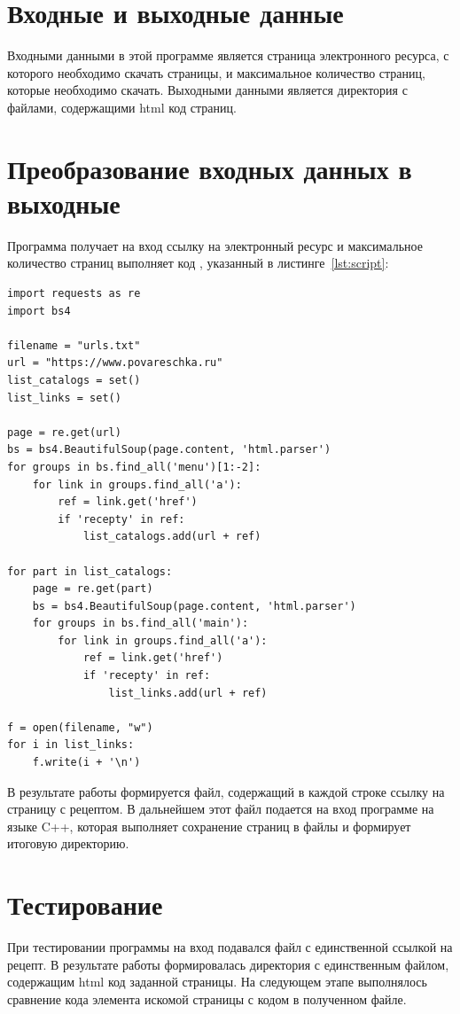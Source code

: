 \documentclass{article}
\begin{document}
\clearpage\section{Входные и выходные данные}
Входными данными в этой программе является страница электронного ресурса, с которого необходимо скачать страницы, и
максимальное количество страниц, которые необходимо скачать. Выходными данными является директория с файлами,
содержащими html код страниц.

\clearpage\section{Преобразование входных данных в выходные}
Программа получает на вход ссылку на электронный ресурс и максимальное количество страниц выполняет код , указанный в
листинге~\ref{lst:script}:
\begin{lstlisting}[style=python, label=lst:script,caption=Скрипт на языке Python$^{[3]}$ для получения файла ссылок ля дальнейшей обработки]
import requests as re
import bs4

filename = "urls.txt"
url = "https://www.povareschka.ru"
list_catalogs = set()
list_links = set()

page = re.get(url)
bs = bs4.BeautifulSoup(page.content, 'html.parser')
for groups in bs.find_all('menu')[1:-2]:
    for link in groups.find_all('a'):
        ref = link.get('href')
        if 'recepty' in ref:
            list_catalogs.add(url + ref)

for part in list_catalogs:
    page = re.get(part)
    bs = bs4.BeautifulSoup(page.content, 'html.parser')
    for groups in bs.find_all('main'):
        for link in groups.find_all('a'):
            ref = link.get('href')
            if 'recepty' in ref:
                list_links.add(url + ref)

f = open(filename, "w")
for i in list_links:
    f.write(i + '\n')
\end{lstlisting}

В результате работы формируется файл, содержащий в каждой строке ссылку на страницу с рецептом. В дальнейшем этот файл
подается на вход программе на языке C++, которая выполняет сохранение страниц в файлы и формирует итоговую директорию.

\clearpage\section{Тестирование}
При тестировании программы на вход подавался файл с единственной ссылкой на рецепт. В результате работы 
формировалась директория с единственным файлом, содержащим html код заданной страницы. На следующем этапе 
выполнялось сравнение кода элемента искомой страницы с кодом в полученном файле.
\end{document}
